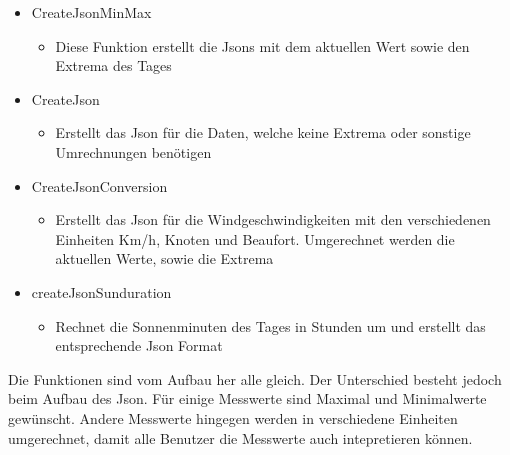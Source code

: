 \begin{itemize}
\item CreateJsonMinMax
\begin{itemize}
\item Diese Funktion erstellt die Jsons mit dem aktuellen Wert sowie den Extrema des Tages
\end{itemize}
\item CreateJson
\begin{itemize}
\item Erstellt das Json für die Daten, welche keine Extrema oder sonstige Umrechnungen benötigen
\end{itemize}
\item CreateJsonConversion
\begin{itemize}
\item Erstellt das Json für die Windgeschwindigkeiten mit den verschiedenen Einheiten Km/h, Knoten und Beaufort. Umgerechnet werden die aktuellen Werte, sowie die Extrema
\end{itemize}
\item createJsonSunduration
\begin{itemize}
\item Rechnet die Sonnenminuten des Tages in Stunden um und erstellt das entsprechende Json Format
\end{itemize}
\end{itemize}

Die Funktionen sind vom Aufbau her alle gleich. Der Unterschied besteht jedoch beim Aufbau des Json. Für einige Messwerte sind Maximal und Minimalwerte gewünscht. Andere Messwerte hingegen werden in verschiedene Einheiten umgerechnet, damit alle Benutzer die Messwerte auch intepretieren können.